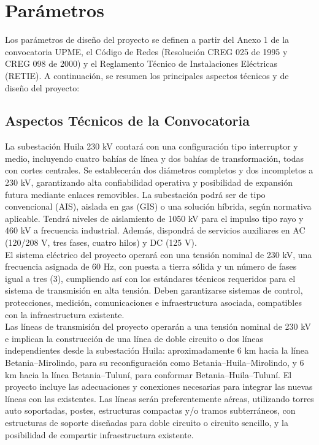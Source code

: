 \section{Parámetros}
Los parámetros de diseño del proyecto se definen a partir del Anexo 1 de la convocatoria UPME, el Código de Redes (Resolución CREG 025 de 1995 y CREG 098 de 2000) y el Reglamento Técnico de Instalaciones Eléctricas (RETIE). A continuación, se resumen los principales aspectos técnicos y de diseño del proyecto: 

\subsection*{Aspectos Técnicos de la Convocatoria}
La subestación Huila 230 kV contará con una configuración tipo interruptor y medio, incluyendo cuatro bahías de línea y dos bahías de transformación, todas con cortes centrales. Se establecerán dos diámetros completos y dos incompletos a 230 kV, garantizando alta confiabilidad operativa y posibilidad de expansión futura mediante enlaces removibles. La subestación podrá ser de tipo convencional (AIS), aislada en gas (GIS) o una solución híbrida, según normativa aplicable. Tendrá niveles de aislamiento de 1050 kV para el impulso tipo rayo y 460 kV a frecuencia industrial. Además, dispondrá de servicios auxiliares en AC (120/208 V, tres fases, cuatro hilos) y DC (125 V).\\El sistema eléctrico del proyecto operará con una tensión nominal de 230 kV, una frecuencia asignada de 60 Hz, con puesta a tierra sólida y un número de fases igual a tres (3), cumpliendo así con los estándares técnicos requeridos para el sistema de transmisión en alta tensión. Deben garantizarse sistemas de control, protecciones, medición, comunicaciones e infraestructura asociada, compatibles con la infraestructura existente.\\Las líneas de transmisión del proyecto operarán a una tensión nominal de 230 kV e implican la construcción de una línea de doble circuito o dos líneas independientes desde la subestación Huila: aproximadamente 6 km hacia la línea Betania–Mirolindo, para su reconfiguración como Betania–Huila–Mirolindo, y 6 km hacia la línea Betania–Tuluní, para conformar Betania–Huila–Tuluní. El proyecto incluye las adecuaciones y conexiones necesarias para integrar las nuevas líneas con las existentes. Las líneas serán preferentemente aéreas, utilizando torres auto soportadas, postes, estructuras compactas y/o tramos subterráneos, con estructuras de soporte diseñadas para doble circuito o circuito sencillo, y la posibilidad de compartir infraestructura existente.

